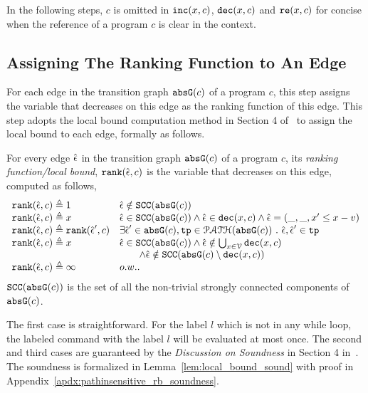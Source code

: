  In the following steps, $c$ is omitted in $\mathtt{inc}(x, c)$,
 $\mathtt{dec}(x, c)$ and $\mathtt{re}(x, c)$ for concise when the reference of a program $c$ is clear in the context.

 \subsection{Assigning The Ranking Function to An Edge}
 For each edge in the transition graph $\mathtt{abs}{\mathtt{G}}(c)$ of a program $c$,
 this step assigns the variable that decreases on this edge as the ranking function of this edge.
 This step adopts the local bound computation method in Section 4 of~\cite{SinnZV17} to assign the local bound to each edge,
 formally as follows.
 \begin{defn}
 \label{def:ranking_gen}
 For every edge $\hat{\mathtt{\epsilon}{}}$ in the transition graph $\mathtt{abs}{\mathtt{G}}(c)$ of a program $c$,
 its \emph{ranking function/local bound}, $\mathtt{rank}(\hat{\mathtt{\epsilon}{}}, c)$
 is the variable that decreases on this edge, computed as follows,
 \[ 
\begin{array}{ll}
 \mathtt{rank}(\hat{\mathtt{\epsilon}{}}, c) \triangleq 1 
 & \hat{\mathtt{\epsilon}{}} \notin \mathtt{SCC}(\mathtt{abs}{\mathtt{G}}(c))
 \\
 \mathtt{rank}(\hat{\mathtt{\epsilon}{}}, c) \triangleq x
 & \hat{\mathtt{\epsilon}{}} \in \mathtt{SCC}(\mathtt{abs}{\mathtt{G}}(c)) \land \hat{\mathtt{\epsilon}{}} \in \mathtt{dec}(x, c) \land \hat{\mathtt{\epsilon}{}} = (\_, \_ , x' \leq x - v) \\
 \mathtt{rank}(\hat{\mathtt{\epsilon}{}}, c) \triangleq \mathtt{rank}(\hat{\mathtt{\epsilon}{}}', c)
 & \exists \hat{\mathtt{\epsilon}{}}' \in \mathtt{abs}{\mathtt{G}}(c), \mathtt{tp} \in \mathcal{PATH}( \mathtt{abs}{\mathtt{G}}(c)) ~.~ \hat{\mathtt{\epsilon}{}}, \hat{\mathtt{\epsilon}{}}' \in \mathtt{tp} \\
 \mathtt{rank}(\hat{\mathtt{\epsilon}{}}, c) \triangleq x
 & \hat{\mathtt{\epsilon}{}} \in \mathtt{SCC}(\mathtt{abs}{\mathtt{G}}(c)) \land 
 \hat{\mathtt{\epsilon}{}} \notin \bigcup_{x \in \mathcal{V}} \mathtt{dec}(x, c) \\
 & \qquad \land \hat{\mathtt{\epsilon}{}} \notin \mathtt{SCC}(\mathtt{abs}{\mathtt{G}}(c) \setminus \mathtt{dec}(x, c))\\
 \mathtt{rank}(\hat{\mathtt{\epsilon}{}}, c) \triangleq \infty
 & o.w..
\end{array}
\]
 $\mathtt{SCC}(\mathtt{abs}{\mathtt{G}}(c))$ is the set of all the non-trivial strongly connected components of $\mathtt{abs}{\mathtt{G}}(c)$.
 \end{defn}
 The first case is straightforward. 
 For the label $l$ which is not in any while loop, 
 the labeled command with the label $l$ will be 
 evaluated at most once. 
 The second and third cases are guaranteed by the \emph{Discussion on Soundness} in Section 4 in~\cite{SinnZV17}.
 The soundness is formalized in Lemma~\ref{lem:local_bound_sound} with proof in Appendix~\ref{apdx:pathinsensitive_rb_soundness}.

